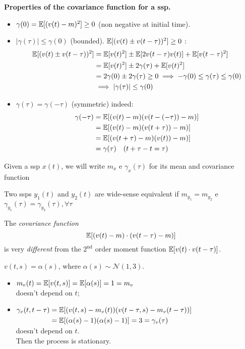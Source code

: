 \textbf{Properties of the covariance function for a \gls{ssp}.}
\begin{itemize}
	\item $\gamma(0)=\mathbb{E}[(v(t)-m)^{2}] \geq 0$ (non negative at initial time).
	\item $|\gamma(\tau)| \leq \gamma(0)$ (bounded).
	\quad  {} $\mathbb{E}[(v(t) \pm v(t-\tau))^2]\ge0$ :\\
	\vspace{-3ex}
	\begin{align*}
		\mathbb{E}[(v(t) \pm v(t-\tau))^2] &= \mathbb{E}[v(t)^2] \pm \mathbb{E}[2v(t-\tau)v(t)]+\mathbb{E}[v(t-\tau)^2]\\
		&=\mathbb{E}[v(t)^2] \pm 2\gamma(\tau)+\mathbb{E}[v(t)^2]\\
		&=2\gamma(0) \pm 2\gamma(\tau) \ge 0 
		\implies -\gamma(0) \leq \gamma(\tau) \leq \gamma(0)\\
		&\implies |\gamma(\tau)| \leq \gamma(0)
	\end{align*}
	\item $\gamma(\tau)=\gamma(-\tau)$ (symmetric) indeed:
	\begin{align*}
		\gamma(-\tau)&=\mathbb{E}[(v(t)-m)(v(t-(-\tau))-m)]\\
		&=\mathbb{E}[(v(t)-m)(v(t+\tau))-m)]\\
		&=\mathbb{E}[(v(t+\tau)-m)(v(t))-m)]\\
		&=\gamma(\tau) \quad(t+\tau-t=\tau)
	\end{align*}
\end{itemize}


Given a \gls{ssp} $x(t)$, we will write $m_{x}$ e $\gamma_{x}(\tau)$ for its mean and covariance function

Two \glspl{ssp} $y_{1}(t)$ and $y_{2}(t)$ are wide-sense equivalent if $m_{y_{1}}=m_{y_{2}}$ e $\gamma_{y_{1}}(\tau)=\gamma_{y_{2}}(\tau), \forall \tau$

The \emph{covariance function}
$$
	\mathbb{E}[(v(t)-m) \cdot(v(t-\tau)-m)]
$$
is very \emph{different} from the $2^{\text{nd}}$ order moment function $\mathbb{E}[v(t) \cdot v(t-\tau)]$.

\begin{example}
$\boxed{v(t,s)=\alpha (s)}$, where $\alpha (s)\sim \mathcal{N}(1,3)$.

\begin{itemize}
	\item $m_{v}(t)=\mathbb{E}[v(t, s)]=\mathbb{E}[\alpha(s)]=1=m_{v}$\\
	doesn't depend on $t$;
	\item $\begin{aligned}[t]
		\gamma_{v}(t, t-\tau)&=\mathbb{E}[(v(t, s)-m_{v}(t))(v(t-\tau, s)-m_{v}(t-\tau))]\\
		&=\mathbb{E}[(\alpha(s)-1)(\alpha(s)-1)]=3=\gamma_{v}(\tau)
	\end{aligned}$\\
	doesn't depend on $t$.\\
	Then the process is stationary.
\end{itemize}
\end{example}

